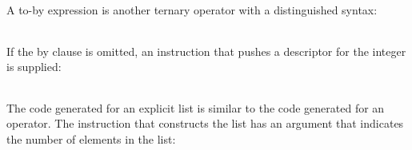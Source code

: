 A to-by expression is another ternary operator with a distinguished syntax:

\begin{center}
\tablelasttail{\hline}
\begin{xtabular}{|m{1.9073598in}|m{2.75596in}|}

\end{xtabular}
\end{center}

If the by clause is omitted, an instruction that pushes a descriptor
for the integer is supplied:

\begin{center}
\tablelasttail{\hline}
\begin{xtabular}{|m{1.9073598in}|m{2.75596in}|}

\end{xtabular}
\end{center}

The code generated for an explicit list is similar to the code
generated for an operator. The instruction that constructs the list
has an argument that indicates the number of elements in the list:

\begin{center}
\tablelasttail{\hline}
\begin{xtabular}{|m{1.9073598in}|m{2.75596in}|}

\end{xtabular}
\end{center}


